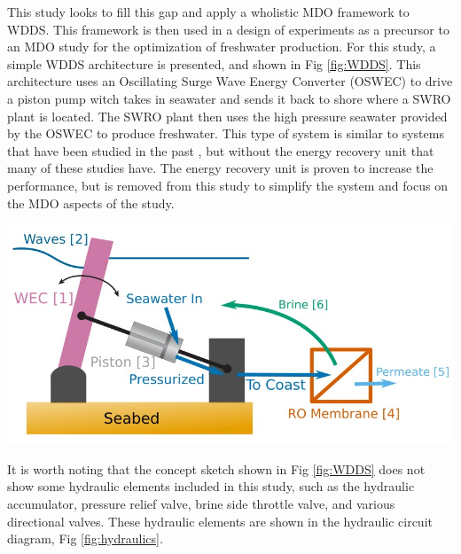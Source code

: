 \documentclass[twocolumn,10pt]{asme2e}
\begin{document}
This study looks to fill this gap and apply a wholistic MDO framework to WDDS. This framework is then used in a design of experiments as a precursor to an MDO study for the optimization of freshwater production. For this study, a simple WDDS architecture is presented, and shown in Fig \ref{fig:WDDS}. This architecture uses an Oscillating Surge Wave Energy Converter (OSWEC) to drive a piston pump witch takes in seawater and sends it back to shore where a SWRO plant is located. The SWRO plant then uses the high pressure seawater provided by the OSWEC to produce freshwater. This type of system is similar to systems that have been studied in the past \cite{Yu2018,Suchithra2022,Mi2023,Simmons2024}, but without the energy recovery unit that many of these studies have. The energy recovery unit is proven to increase the performance, but is removed from this study to simplify the system and focus on the MDO aspects of the study. 

\begin{center}
    \includegraphics[width=\linewidth]{../figs/WDDS.png}
    \label{fig:WDDS}
\end{center}

It is worth noting that the concept sketch shown in Fig \ref{fig:WDDS} does not show some hydraulic elements included in this study, such as the hydraulic accumulator, pressure relief valve, brine side throttle valve, and various directional valves. These hydraulic elements are shown in the hydraulic circuit diagram, Fig \ref{fig:hydraulics}.
\end{document}
